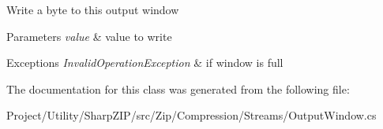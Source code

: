 Write a byte to this output window 


\begin{DoxyParams}{Parameters}
{\em value} & value to write\\
\hline
\end{DoxyParams}

\begin{DoxyExceptions}{Exceptions}
{\em Invalid\+Operation\+Exception} & if window is full \\
\hline
\end{DoxyExceptions}


The documentation for this class was generated from the following file\+:\begin{DoxyCompactItemize}
\item 
Project/\+Utility/\+Sharp\+Z\+I\+P/src/\+Zip/\+Compression/\+Streams/Output\+Window.\+cs\end{DoxyCompactItemize}
